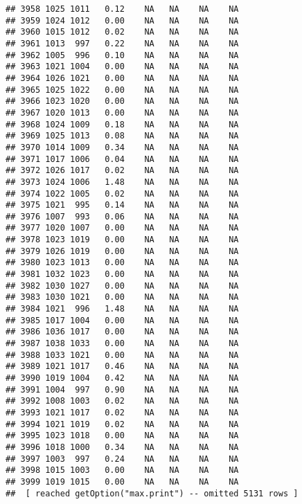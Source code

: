 \documentclass{article}\usepackage{graphicx, color}
\makeatletter
\newenvironment{kframe}{%
 \def\at@end@of@kframe{}%
 \ifinner\ifhmode%
  \def\at@end@of@kframe{\end{minipage}}%
  \begin{minipage}{\columnwidth}%
 \fi\fi%
 \def\FrameCommand##1{\hskip\@totalleftmargin \hskip-\fboxsep
 \colorbox{shadecolor}{##1}\hskip-\fboxsep
     \hskip-\linewidth \hskip-\@totalleftmargin \hskip\columnwidth}%
 \MakeFramed {\advance\hsize-\width
   \@totalleftmargin\z@ \linewidth\hsize
   \@setminipage}}%
 {\par\unskip\endMakeFramed%
 \at@end@of@kframe}
\newenvironment{knitrout}{}{} %
\makeatother
\begin{document}
\begin{knitrout}
\begin{kframe}
\begin{verbatim}
## 3958 1025 1011   0.12    NA   NA    NA    NA
## 3959 1024 1012   0.00    NA   NA    NA    NA
## 3960 1015 1012   0.02    NA   NA    NA    NA
## 3961 1013  997   0.22    NA   NA    NA    NA
## 3962 1005  996   0.10    NA   NA    NA    NA
## 3963 1021 1004   0.00    NA   NA    NA    NA
## 3964 1026 1021   0.00    NA   NA    NA    NA
## 3965 1025 1022   0.00    NA   NA    NA    NA
## 3966 1023 1020   0.00    NA   NA    NA    NA
## 3967 1020 1013   0.00    NA   NA    NA    NA
## 3968 1024 1009   0.18    NA   NA    NA    NA
## 3969 1025 1013   0.08    NA   NA    NA    NA
## 3970 1014 1009   0.34    NA   NA    NA    NA
## 3971 1017 1006   0.04    NA   NA    NA    NA
## 3972 1026 1017   0.02    NA   NA    NA    NA
## 3973 1024 1006   1.48    NA   NA    NA    NA
## 3974 1022 1005   0.02    NA   NA    NA    NA
## 3975 1021  995   0.14    NA   NA    NA    NA
## 3976 1007  993   0.06    NA   NA    NA    NA
## 3977 1020 1007   0.00    NA   NA    NA    NA
## 3978 1023 1019   0.00    NA   NA    NA    NA
## 3979 1026 1019   0.00    NA   NA    NA    NA
## 3980 1023 1013   0.00    NA   NA    NA    NA
## 3981 1032 1023   0.00    NA   NA    NA    NA
## 3982 1030 1027   0.00    NA   NA    NA    NA
## 3983 1030 1021   0.00    NA   NA    NA    NA
## 3984 1021  996   1.48    NA   NA    NA    NA
## 3985 1017 1004   0.00    NA   NA    NA    NA
## 3986 1036 1017   0.00    NA   NA    NA    NA
## 3987 1038 1033   0.00    NA   NA    NA    NA
## 3988 1033 1021   0.00    NA   NA    NA    NA
## 3989 1021 1017   0.46    NA   NA    NA    NA
## 3990 1019 1004   0.42    NA   NA    NA    NA
## 3991 1004  997   0.90    NA   NA    NA    NA
## 3992 1008 1003   0.02    NA   NA    NA    NA
## 3993 1021 1017   0.02    NA   NA    NA    NA
## 3994 1021 1019   0.02    NA   NA    NA    NA
## 3995 1023 1018   0.00    NA   NA    NA    NA
## 3996 1018 1000   0.34    NA   NA    NA    NA
## 3997 1003  997   0.24    NA   NA    NA    NA
## 3998 1015 1003   0.00    NA   NA    NA    NA
## 3999 1019 1015   0.00    NA   NA    NA    NA
##  [ reached getOption("max.print") -- omitted 5131 rows ]
\end{verbatim}
\end{kframe}
\end{knitrout}
\end{document}
